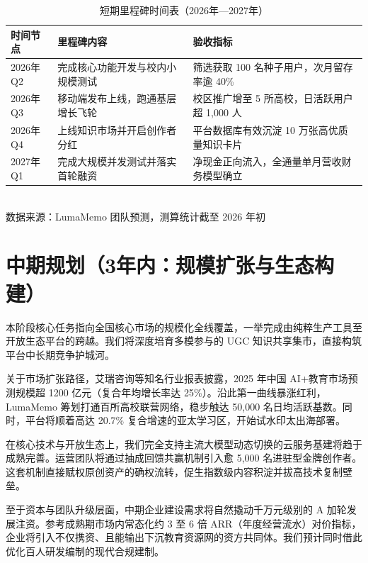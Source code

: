 \begin{table}[htbp]
  \centering
  \caption{短期里程碑时间表（2026年—2027年）}
  \begin{tabular}{p{} p{} p{}}
    \toprule
    \textbf{时间节点} & \textbf{里程碑内容} & \textbf{验收指标} \\
    \midrule
     2026年Q2  & 完成核心功能开发与校内小规模测试 & 筛选获取 100 名种子用户，次月留存率逾 40\% \\
     2026年Q3  & 移动端发布上线，跑通基层增长飞轮 & 校区推广增至 5 所高校，日活跃用户超 1,000 人 \\
     2026年Q4  & 上线知识市场并开启创作者分红 & 平台数据库有效沉淀 10 万张高优质量知识卡片 \\
     2027年Q1  & 完成大规模并发测试并落实首轮融资 & 净现金正向流入，全通量单月营收财务模型确立 \\
    \bottomrule
  \end{tabular}
  \vspace{0.5cm}
  \\ 
  \small 数据来源：LumaMemo 团队预测，测算统计截至 2026 年初
\end{table}

\section{中期规划（3年内：规模扩张与生态构建）}

本阶段核心任务指向全国核心市场的规模化全线覆盖，一举完成由纯粹生产工具至开放生态平台的跨越。我们将深度培育多模参与的 UGC 知识共享集市，直接构筑平台中长期竞争护城河。

关于市场扩张路径，艾瑞咨询等知名行业报表披露，2025 年中国 AI+教育市场预测规模超 1200 亿元（复合年均增长率达 25\%）。沿此第一曲线暴涨红利，LumaMemo 筹划打通百所高校联营网络，稳步触达 50,000 名日均活跃基数。同时，平台将顺着高达 20.7\% 复合增速的亚太学习区，开始试水印太出海部署。

在核心技术与开放生态上，我们完全支持主流大模型动态切换的云服务基建将趋于成熟完善。运营团队将通过抽成回馈共赢机制引入愈 5,000 名进驻型金牌创作者。这套机制直接赋权原创资产的确权流转，促生指数级内容积淀并拔高技术复制壁垒。

至于资本与团队升级层面，中期企业建设需求将自然撬动千万元级别的 A 加轮发展注资。参考成熟期市场内常态化约 3 至 6 倍 ARR（年度经营流水）对价指标，企业将引入不仅携资、且能输出下沉教育资源网的资方共同体。我们预计同时借此优化百人研发编制的现代合规建制。

